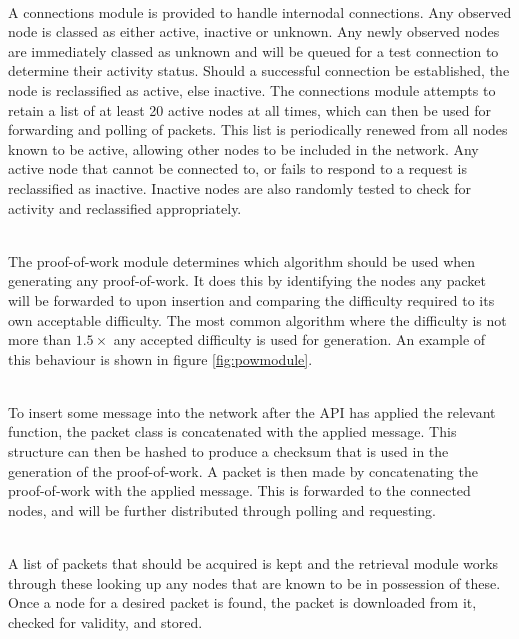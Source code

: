 		\begin{description}[topsep=-5pt,itemsep=-1ex,partopsep=2ex,parsep=1.5ex]
			\item[Connection Module] \hfill \\
				A connections module is provided to handle internodal connections. Any observed node is classed as either active, inactive or unknown. Any newly observed nodes are immediately classed as unknown and will be queued for a test connection to determine their activity status. Should a successful connection be established, the node is reclassified as active, else inactive. The connections module attempts to retain a list of at least 20 active nodes at all times, which can then be used for forwarding and polling of packets. This list is periodically renewed from all nodes known to be active, allowing other nodes to be included in the network. Any active node that cannot be connected to, or fails to respond to a request is reclassified as inactive. Inactive nodes are also randomly tested to check for activity and reclassified appropriately.
			\item[Proof-of-Work Module] \hfill \\
				The proof-of-work module determines which algorithm should be used when generating any proof-of-work. It does this by identifying the nodes any packet will be forwarded to upon insertion and comparing the difficulty required to its own acceptable difficulty. The most common algorithm where the difficulty is not more than $1.5\times$ any accepted difficulty is used for generation. An example of this behaviour is shown in figure \ref{fig:powmodule}.
			\item[Insertion Module] \hfill \\
				To insert some message into the network after the API has applied the relevant function, the packet class is concatenated with the applied message. This structure can then be hashed to produce a checksum that is used in the generation of the proof-of-work. A packet is then made by concatenating the proof-of-work with the applied message. This is forwarded to the connected nodes, and will be further distributed through polling and requesting.
			\item[Retrieval Module] \hfill \\
				A list of packets that should be acquired is kept and the retrieval module works through these looking up any nodes that are known to be in possession of these. Once a node for a desired packet is found, the packet is downloaded from it, checked for validity, and stored.

\end{description}
